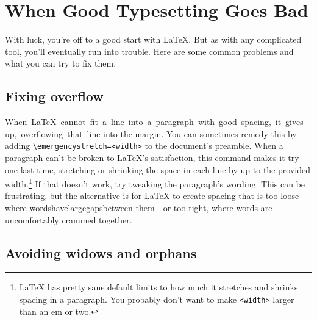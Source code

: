 \chapter{When Good Typesetting Goes Bad}

With luck, you're off to a good start with \LaTeX.
But as with any complicated tool, you'll eventually run into trouble.
Here are some common problems and what you can try to fix them.

\section{Fixing overflow}

\mbox{When \LaTeX{} cannot fit a line into a paragraph with good spacing,
it gives up, overflowing that line}
into the margin.
You can sometimes remedy this by adding
\verb|\emergencystretch=<width>| to the document's preamble.
When a paragraph can't be broken to \LaTeX's satisfaction,
this command makes it try one last time,
stretching or shrinking the space in each line by up to the provided
width.\punckern\footnote{\LaTeX{} has pretty sane default limits to how much
it stretches and shrinks spacing in a paragraph.
You probably don't want to make \texttt{<width>} larger than an em or two.}
If that doesn't work, try tweaking the paragraph's wording.
This can be frustrating, but the alternative is for \LaTeX{} to create spacing
that is too loose---where\enspace
words\enspace have\enspace large\quad gaps\quad between\enspace
them---or too tight, where\! words\! are\! uncomfortably\! crammed\! together.

\section{Avoiding widows and orphans}

